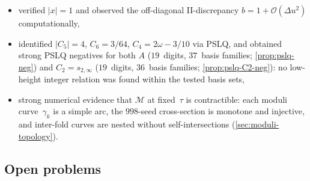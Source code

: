 \documentclass[11pt,a4paper]{article}
\theoremstyle{plain}
\theoremstyle{definition}
\theoremstyle{remark}
\newcommand{\abs}[1]{\lvert #1 \rvert}
\newcommand{\Oo}{\mathcal{O}}
\begin{document}
\begin{itemize}[nosep]
  protocol, with conformality residual $< 8.5 \times 10^{-7}$
  from analytic derivatives,
\item verified $\abs{x} = 1$ and observed the off-diagonal
  II-discrepancy $b = 1 + \Oo(\Delta u^2)$ computationally,
\item identified $\lvert C_5\rvert = 4$, $C_6 = 3/64$, $C_4 = 2\omega - 3/10$
  via PSLQ, and obtained strong PSLQ negatives for
  both $A$ ($19$~digits, $37$~basis families; \cref{prop:pslq-neg}) and
  $C_2 = s_{2,\infty}$ ($19$~digits, $36$~basis families;
  \cref{prop:pslq-C2-neg}): no low-height integer relation
  was found within the tested basis sets,
\item strong numerical evidence that $\mathcal{M}$ at fixed~$\tau$
  is contractible:
  each moduli curve~$\gamma_k$ is a simple arc, the $998$-seed
  cross-section is monotone and injective, and inter-fold curves
  are nested without self-intersections
  (\cref{sec:moduli-topology}).
\end{itemize}

\subsection{Open problems}
\end{document}
